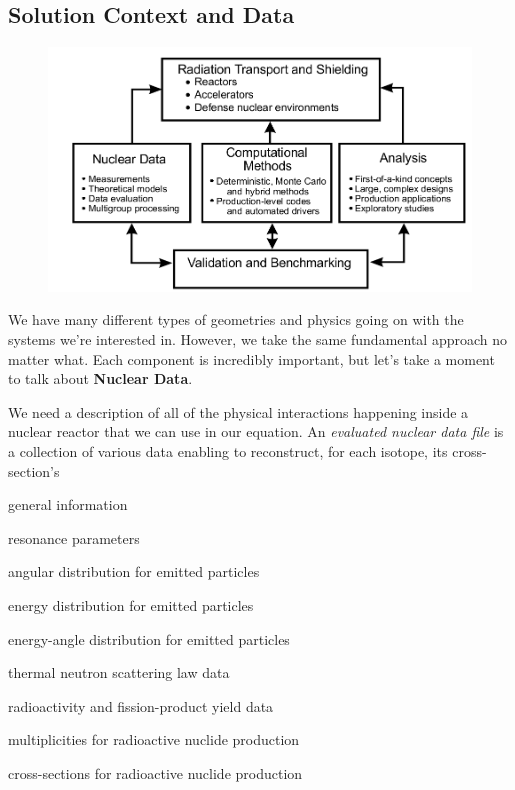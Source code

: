 \documentclass[12pt]{article}
\begin{document}
\subsection*{Solution Context and Data}%
\begin{figure}[h!]
    \begin{center}
    \includegraphics[keepaspectratio, width = 4.5 in]{../figs/solver-map}
    \end{center}
    \label{fig:context}
\end{figure}
%
We have many different types of geometries and physics going on with the systems we're interested in. However, we take the same fundamental approach no matter what. Each component is incredibly important, but let's take a moment to talk about \textbf{Nuclear Data}.

We need a description of all of the physical interactions happening inside a nuclear reactor that we can use in our equation. An \textit{evaluated nuclear data file} is a collection of various data enabling to reconstruct, for each isotope, its cross-section's 
\begin{compactitem}
\item general information
\item resonance parameters 
\item angular distribution for emitted particles 
\item energy distribution for emitted particles 
\item energy-angle distribution for emitted particles 
\item thermal neutron scattering law data 
\item radioactivity and fission-product yield data 
\item multiplicities for radioactive nuclide production 
\item cross-sections for radioactive nuclide production
\end{compactitem}
\end{document}
